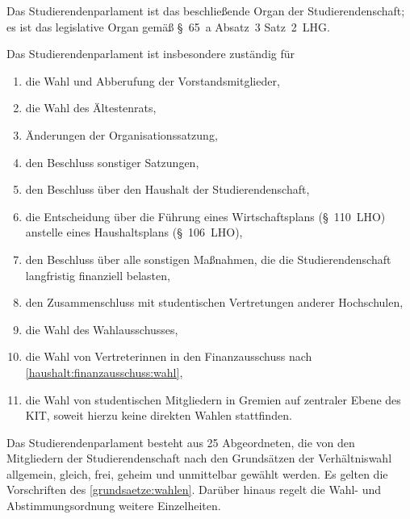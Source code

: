 \begin{contract}
Das Studierendenparlament ist das beschließende Organ der Studierendenschaft; es ist das legislative Organ gemäß §~65~a Absatz~3 Satz~2~LHG.

Das Studierendenparlament ist insbesondere zuständig für
\begin{enumerate}
\item die Wahl und Abberufung der Vorstandsmitglieder,
\item die Wahl des Ältestenrats,
\item Änderungen der Organisationssatzung,
\item den Beschluss sonstiger Satzungen,
\item den Beschluss über den Haushalt der Studierendenschaft,
\item die Entscheidung über die Führung eines Wirtschaftsplans (§~110~LHO) anstelle eines Haushaltsplans (§~106~LHO),
\item den Beschluss über alle sonstigen Maßnahmen, die die Studierendenschaft langfristig finanziell belasten,
\item den Zusammenschluss mit studentischen Vertretungen anderer Hochschulen,
\item die Wahl des Wahlausschusses,
\item die Wahl von Vertreterinnen in den Finanzausschuss nach \ref{haushalt:finanzausschuss:wahl},
\item die Wahl von studentischen Mitgliedern in Gremien auf zentraler Ebene des KIT, soweit hierzu keine direkten Wahlen stattfinden.
\end{enumerate}


\label{stupa:zusammensetzung}

Das Studierendenparlament besteht aus 25 Abgeordneten, die von den Mitgliedern der Studierendenschaft nach den Grundsätzen der Verhältniswahl allgemein, gleich, frei, geheim und unmittelbar gewählt werden. Es gelten die Vorschriften des \ref{grundsaetze:wahlen}. Darüber hinaus regelt die Wahl- und Abstimmungsordnung weitere Einzelheiten.


\end{contract}
